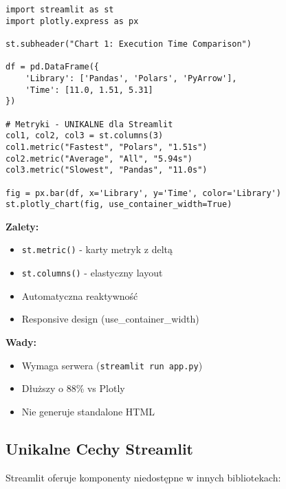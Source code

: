 \documentclass[a4paper,11pt]{article}
\begin{document}
\begin{lstlisting}[caption={Streamlit - Wykres z metrykami},label={lst:streamlit_chart1}]
import streamlit as st
import plotly.express as px

st.subheader("Chart 1: Execution Time Comparison")

df = pd.DataFrame({
    'Library': ['Pandas', 'Polars', 'PyArrow'],
    'Time': [11.0, 1.51, 5.31]
})

# Metryki - UNIKALNE dla Streamlit
col1, col2, col3 = st.columns(3)
col1.metric("Fastest", "Polars", "1.51s")
col2.metric("Average", "All", "5.94s")
col3.metric("Slowest", "Pandas", "11.0s")

fig = px.bar(df, x='Library', y='Time', color='Library')
st.plotly_chart(fig, use_container_width=True)
\end{lstlisting}

\textbf{Zalety:}
\begin{itemize}
    \item \texttt{st.metric()} - karty metryk z deltą
    \item \texttt{st.columns()} - elastyczny layout
    \item Automatyczna reaktywność
    \item Responsive design (use\_container\_width)
\end{itemize}

\textbf{Wady:}
\begin{itemize}
    \item Wymaga serwera (\texttt{streamlit run app.py})
    \item Dłuższy o 88\% vs Plotly
    \item Nie generuje standalone HTML
\end{itemize}

\subsection{Unikalne Cechy Streamlit}

Streamlit oferuje komponenty niedostępne w innych bibliotekach:
\end{document}
